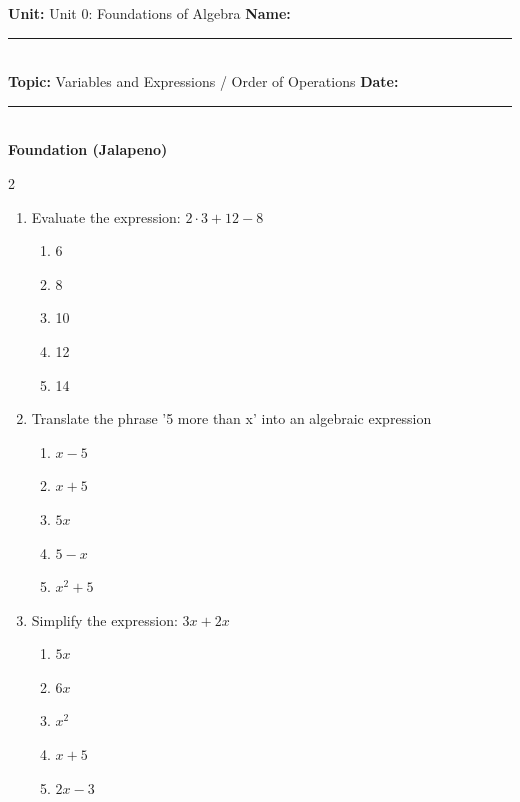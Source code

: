 \documentclass[10pt]{article}
\begin{document}
\enlargethispage{2.5cm}

\begin{tcolorbox}[colback=mainblue!5, colframe=mainblue, sharp corners, boxrule=0.5pt]
    \small \textbf{Unit:} Unit 0: Foundations of Algebra \hfill \textbf{Name:} \rule{3cm}{0.4pt} \\
    \small \textbf{Topic:} Variables and Expressions / Order of Operations \hfill \textbf{Date:} \rule{2cm}{0.4pt} \\
    \centering \textbf{\large Foundation (Jalapeno)}
\end{tcolorbox}

\vspace{0.2cm}

\begin{multicols}{2}
\begin{enumerate}[label=\textbf{Q\arabic*.}, leftmargin=*, itemsep=6pt, parsep=0pt]

  \item \small Evaluate the expression: $2 \cdot 3 + 12 - 8$
  \begin{enumerate}[label=(\Alph*), leftmargin=0.6cm, nosep, itemsep=2pt]
    \item 6
    \item 8
    \item 10
    \item 12
    \item 14
  \end{enumerate}

  \item \small Translate the phrase '5 more than x' into an algebraic expression
  \begin{enumerate}[label=(\Alph*), leftmargin=0.6cm, nosep, itemsep=2pt]
    \item $x - 5$
    \item $x + 5$
    \item $5x$
    \item $5 - x$
    \item $x^2 + 5$
  \end{enumerate}

  \item \small Simplify the expression: $3x + 2x$
  \begin{enumerate}[label=(\Alph*), leftmargin=0.6cm, nosep, itemsep=2pt]
    \item $5x$
    \item $6x$
    \item $x^2$
    \item $x + 5$
    \item $2x - 3$
  \end{enumerate}


\end{enumerate}
\end{multicols}
\end{document}
